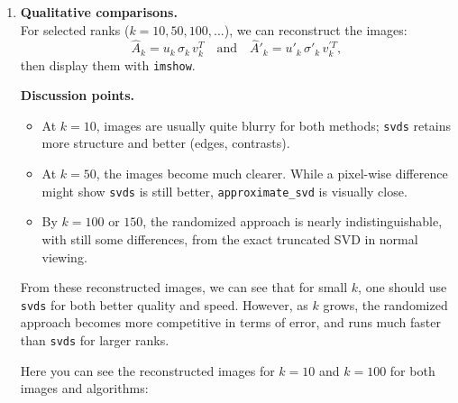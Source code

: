 \documentclass[11pt,a4paper, margin=1in]{article}
\begin{document}
\begin{enumerate}
    \item \textbf{Qualitative comparisons.} \\
    For selected ranks ($k=10, 50, 100, ...$), we can reconstruct
    the images:
    \[
      \hat{A}_{k} = u_{k}\,\sigma_{k}\,v_{k}^{T}
      \quad \text{and} \quad
      \hat{A}'_{k} = u'_{k}\,\sigma'_{k}\,v_{k}^{'T},
    \]
    then display them with \texttt{imshow}. 

    \textbf{Discussion points.}
    \begin{itemize}
      \item At $k=10$, images are usually quite blurry for both methods; 
      \texttt{svds} retains more structure and better (edges, contrasts).
      
      \item At $k=50$, the images become much clearer. While a pixel-wise difference might show 
      \texttt{svds} is still better, \texttt{approximate\_svd} is visually close.
      
      \item By $k=100$ or $150$, the randomized approach is nearly indistinguishable, with still some differences, 
      from the exact truncated SVD in normal viewing.
    \end{itemize}

    From these reconstructed images, we can see that for small $k$,
    one should use \texttt{svds} for both better quality and speed. 
    However, as $k$ grows, the randomized approach becomes more competitive
    in terms of error, and runs much faster than \texttt{svds} for larger ranks.

    Here you can see the reconstructed images for \(k=10\) and \(k=100\) for both images and algorithms:
    

\end{enumerate}
\end{document}
